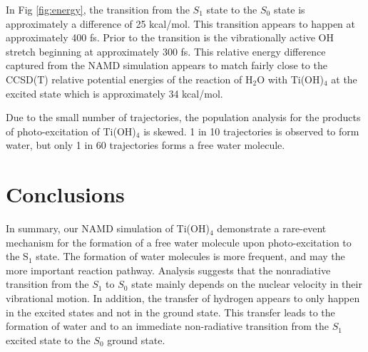 \documentclass[11pt]{article}
\begin{document}
In Fig \ref{fig:energy}, the transition from the $S_1$ state to the $S_0$
state is approximately a difference of 25 kcal/mol. This transition appears
to happen at approximately 400 fs. Prior to the transition is the
vibrationally active OH stretch beginning at approximately 300 fs. This
relative energy difference captured from the NAMD simulation appears to match
fairly close to the CCSD(T) relative potential energies of the reaction
of H$_2$O with Ti(OH)$_4$ at the excited state\cite{C5CP01812A} which is
approximately 34 kcal/mol.

Due to the small number of trajectories, the population analysis
for the products of photo-excitation of Ti(OH)$_4$ is skewed. 1
in 10 trajectories is observed to form water, but only 1 
in 60 trajectories forms a free water molecule.

\section{Conclusions}

In summary, our NAMD simulation of Ti(OH)$_4$ demonstrate a
rare-event
mechanism for the formation of a free water molecule upon
photo-excitation to the S$_1$ state. The formation of water
molecules is more frequent, and may
the more important reaction pathway. Analysis suggests that the 
nonradiative
transition from the $S_1$ to $S_0$ state mainly depends on the nuclear
velocity in their vibrational motion. 
In addition, the transfer of hydrogen
appears to only happen in the excited states and not in the ground state.
This transfer leads to the formation of water and to an
immediate non-radiative transition
from the $S_1$ excited state to the $S_0$ ground state. 

\printbibliography
\end{document}
